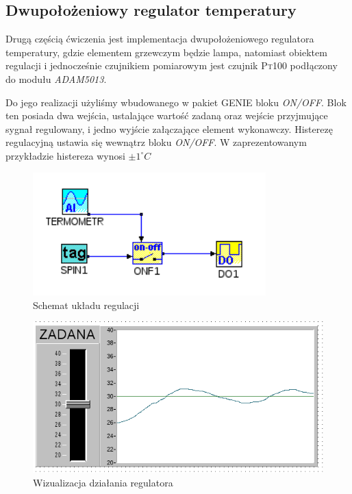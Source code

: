 \documentclass[12pt]{article}
\begin{document}
\newpage

\subsection{Dwupołożeniowy regulator temperatury}

Drugą częścią ćwiczenia jest implementacja dwupołożeniowego regulatora
temperatury, gdzie elementem grzewczym będzie lampa, natomiast obiektem
regulacji i jednocześnie czujnikiem pomiarowym jest czujnik \textsc{Pt100}
podłączony do modułu \textit{ADAM5013}.

Do jego realizacji użyliśmy wbudowanego w pakiet \textsc{GENIE} bloku
\textit{ON/OFF}. Blok ten posiada dwa wejścia, ustalające wartość zadaną oraz
wejście przyjmujące sygnał regulowany, i jedno wyjście załączające element
wykonawczy. Histerezę regulacyjną ustawia się wewnątrz bloku \textit{ON/OFF}. W
zaprezentowanym przykładzie histereza wynosi $\pm 1^{\circ}C$

\begin{figure}[!htb]
	\begin{center}
		\includegraphics[width=9cm]{../res/img/task2.png}
	\end{center}
	\caption{Schemat układu regulacji}
\end{figure}

\begin{figure}[!htb]
	\begin{center}
		\includegraphics[width=\linewidth]{../res/img/disp2.png}
	\end{center}
	\caption{Wizualizacja działania regulatora}
\end{figure} 
\end{document}
